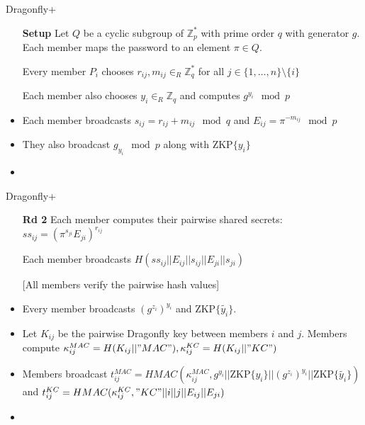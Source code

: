 \documentclass{beamer}
\theoremstyle{definition}
\begin{document}

\begin{frame}{Dragonfly+}
    \begin{itemize}
        \item[\textbf{Setup}] Let $Q$ be a cyclic subgroup of $\mathbb{Z}_p^*$ with prime order $q$ with generator $g$.
            Each member maps the password to an element $\pi \in Q$.
        \item[] Every member $P_i$ chooses $r_{ij}, m_{ij} \in_R \mathbb{Z}_q^*$ for all $j \in \{1,\ldots,n\} \setminus \{i\}$
        \item[] Each member also chooses $y_i \in_R \mathbb{Z}_q$ and computes $g^{y_i} \mod p$
        
        \item<2->[\textbf{Rd 1}] Each member broadcasts $s_{ij} = r_{ij} + m_{ij} \mod q$ and $E_{ij} = \pi^{-m_{ij}} \mod p$
        \item<2->[] They also broadcast $g_{y_i} \mod p$ along with $\text{ZKP}\{y_i\}$
        \item<2->[] [All members verify the ZKP, verify $g_{z_i} \neq 1$ and check for reflection attacks]
    \end{itemize}
\end{frame}

\begin{frame}{Dragonfly+}
    \begin{itemize}
        \item[\textbf{Rd 2}] Each member computes their pairwise shared secrets: $ss_{ij} = (\pi^{s_{ji}} E_{ji})^{r_{ij}}$
        \item[] Each member broadcasts $H(ss_{ij} || E_{ij} || s_{ij} || E_{ji} || s_{ji})$
        \item[] [All members verify the pairwise hash values]
        
        \item<2->[\textbf{Rd 3}] Every member broadcasts $(g^{z_i})^{y_i}$ and $\text{ZKP}\{\tilde{y_i}\}$.
        \item<2->[] Let $K_{ij}$ be the pairwise Dragonfly key between members $i$ and $j$. Members compute
            $\kappa_{ij}^{MAC} = H(K_{ij} || "MAC"), \kappa_{ij}^{KC} = H(K_{ij} || "KC")$
        \item<2->[] Members broadcast $t_{ij}^{MAC} = HMAC(\kappa_{ij}^{MAC},  g^{y_i} || \text{ZKP}\{y_i\} || (g^{z_i})^{y_i} || \text{ZKP}\{\tilde{y_i}\})$
            and $t_{ij}^{KC} = HMAC(\kappa_{ij}^{KC}, "KC" || i || j || E_{ij} || E_{ji})$
        \item<2->[] [All members verify $\text{ZKP}\{\tilde{y_i}\}$, $t_{ji}^{MAC}$ and $t_{ij}^{KC}$ are correct]
    \end{itemize}
\end{frame}
\end{document}

